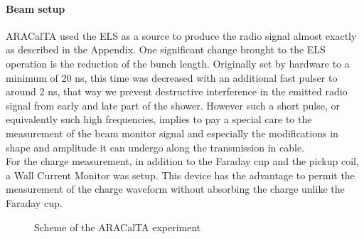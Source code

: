 \documentclass[12pt]{article}
\begin{document}
\paragraph{Beam setup}
ARACalTA used the ELS as a source to produce the radio signal almost exactly as described in the Appendix. One significant change brought to the ELS operation is the reduction of the bunch length. Originally set by hardware to a minimum of 20 ns, this time was decreased with an additional fast pulser to around 2 ns, that way we prevent destructive interference in the emitted radio signal from early and late part of the shower. However such a short pulse, or equivalently such high frequencies, implies to pay a special care to the measurement of the beam monitor signal and especially the modifications in shape and amplitude it can undergo along the transmission in cable.\\ For the charge measurement, in addition to the Faraday cup and the pickup coil, a Wall Current Monitor was setup. This device has the advantage to permit the measurement of the charge waveform without absorbing the charge unlike the Faraday cup.
\begin{figure}[!h]
  \centering
  \hspace*{-3ex}
  \caption{Scheme of the ARACalTA experiment}
  \label{fig:scheme}
\end{figure}
\end{document}
